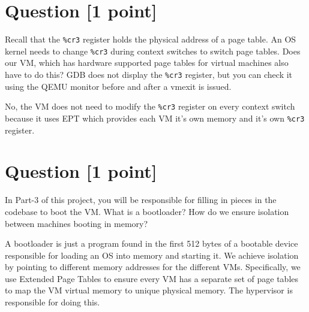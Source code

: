 \documentclass[11pt]{article}
\begin{document}
\section{Question [1 point]}

Recall that the \texttt{\%cr3} register holds the physical address of a page table. An OS kernel needs to change \texttt{\%cr3} during context switches to switch page tables. Does our VM, which has hardware supported page tables for virtual machines also have to do this? GDB does not display the \texttt{\%cr3} register, but you can check it using the QEMU monitor before and after a vmexit is issued.

\begin{solution}
No, the VM does not need to modify the \texttt{\%cr3} register on every context switch because it uses EPT which provides each VM it's own memory and it's own \texttt{\%cr3} register.
\end{solution}


\section{Question [1 point]}

In Part-3 of this project, you will be responsible for filling in pieces in the codebase to boot the VM. What is a bootloader? How do we ensure isolation between machines booting in memory?

\begin{solution}
A bootloader is just a program found in the first 512 bytes of a bootable device responsible for loading an OS into memory and starting it. We achieve isolation by pointing to different memory addresses for the different VMs. 
Specifically, we use Extended Page Tables to ensure every VM has a separate set of page tables to map the VM virtual memory to unique physical memory. 
The hypervisor is responsible for doing this. 
\end{solution}
\end{document}
